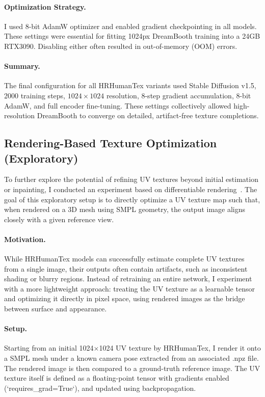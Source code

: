 \paragraph{Optimization Strategy.}
I used 8-bit AdamW optimizer and enabled gradient checkpointing in all models. These settings were essential for fitting 1024px DreamBooth training into a 24GB RTX3090. Disabling either often resulted in out-of-memory (OOM) errors.

\paragraph{Summary.}
The final configuration for all HRHumanTex variants used Stable Diffusion v1.5, 2000 training steps, $1024\times1024$ resolution, 8-step gradient accumulation, 8-bit AdamW, and full encoder fine-tuning. These settings collectively allowed high-resolution DreamBooth to converge on detailed, artifact-free texture completions.

\subsection{Rendering-Based Texture Optimization (Exploratory)}
\label{sec:render_opt}

To further explore the potential of refining UV textures beyond initial estimation or inpainting, I conducted an experiment based on differentiable rendering~\cite{ravi2020pytorch3d}. The goal of this exploratory setup is to directly optimize a UV texture map such that, when rendered on a 3D mesh using SMPL geometry, the output image aligns closely with a given reference view.

\paragraph{Motivation.}  
While HRHumanTex models can successfully estimate complete UV textures from a single image, their outputs often contain artifacts, such as inconsistent shading or blurry regions. Instead of retraining an entire network, I experiment with a more lightweight approach: treating the UV texture as a learnable tensor and optimizing it directly in pixel space, using rendered images as the bridge between surface and appearance.

\paragraph{Setup.}  
Starting from an initial 1024$\times$1024 UV texture by HRHumanTex, I render it onto a SMPL mesh under a known camera pose extracted from an associated .npz file. The rendered image is then compared to a ground-truth reference image. The UV texture itself is defined as a floating-point tensor with gradients enabled (`requires\_grad=True`), and updated using backpropagation.

